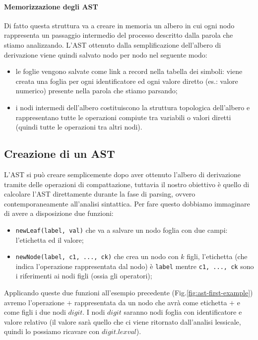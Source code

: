 \documentclass[class=book, crop=false, oneside, 12pt]{standalone}
\begin{document}
\paragraph{Memorizzazione degli AST} Di fatto questa struttura va a creare in memoria un albero in cui ogni nodo rappresenta un passaggio intermedio del processo descritto dalla parola che stiamo analizzando. L'AST ottenuto dalla semplificazione dell'albero di derivazione viene quindi salvato nodo per nodo nel seguente modo:
\begin{itemize}
    \item le foglie vengono salvate come link a record nella tabella dei simboli: viene creata una foglia per ogni identificatore ed ogni valore diretto (es.: valore numerico) presente nella parola che stiamo parsando;
    \item i nodi intermedi dell'albero costituiscono la struttura topologica dell'albero e rappresentano tutte le operazioni compiute tra variabili o valori diretti (quindi tutte le operazioni tra altri nodi).
\end{itemize}

\subsection{Creazione di un AST}
L'AST si può creare semplicemente dopo aver ottenuto l'albero di derivazione tramite delle operazioni di compattazione, tuttavia il nostro obiettivo è quello di calcolare l'AST direttamente durante la fase di parsing, ovvero contemporaneamente all'analisi sintattica.
Per fare questo dobbiamo immaginare di avere a disposizione due funzioni:
\begin{itemize}
    \item \texttt{newLeaf(label, val)} che va a salvare un nodo foglia con due campi: l'etichetta ed il valore;
    \item \texttt{newNode(label, c1, ..., ck)} che crea un nodo con \(k\) figli, l'etichetta (che indica l'operazione rappresentata dal nodo) è \texttt{label} mentre \texttt{c1, ..., ck} sono i riferimenti ai nodi figli (ossia gli operatori);
\end{itemize}
Applicando queste due funzioni all'esempio precedente (Fig.\ref{fig:ast-first-example}) avremo l'operazione \(+\) rappresentata da un nodo che avrà come etichetta \(+\) e come figli i due nodi \(digit\).
I nodi \(digit\) saranno nodi foglia con identificatore e valore relativo (il valore sarà quello che ci viene ritornato dall'analisi lessicale, quindi lo possiamo ricavare con \(digit.lexval\)).\\
\end{document}
